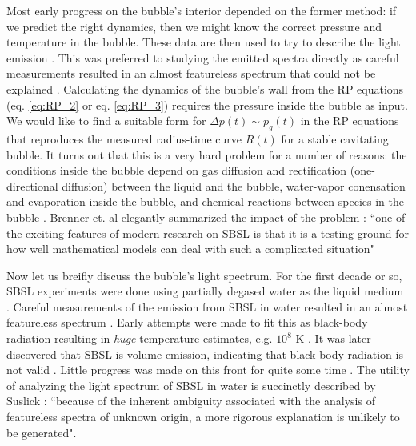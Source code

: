 \documentclass[rmp,aps,nofootinbib,superscriptaddress,floatfix]{revtex4-2}
\begin{document}
Most early progress on the bubble's interior depended on the former method: if we predict the right dynamics, then we might know the correct pressure and temperature in the bubble. These data are then used to try to describe the light emission \cite{}. This was preferred to studying the emitted spectra directly as careful measurements resulted in an almost featureless spectrum that could not be explained \cite{}. Calculating the dynamics of the bubble's wall from the RP equations (eq. \ref{eq:RP_2} or eq. \ref{eq:RP_3}) requires the pressure inside the bubble as input. We would like to find a suitable form for $\Delta p(t) \sim p_g(t)$ in the RP equations that reproduces the measured radius-time curve $R(t)$ for a stable cavitating bubble. It turns out that this is a very hard problem for a number of reasons: the conditions inside the bubble depend on gas diffusion and rectification (one-directional diffusion) between the liquid and the bubble, water-vapor conensation and evaporation inside the bubble, and chemical reactions between species in the bubble \cite{brenner2002single}. Brenner et. al elegantly summarized the impact of the problem \cite{brenner2002single}: ``one of the exciting features of modern research on SBSL is that it is a testing ground for how well mathematical models can deal with such a complicated situation"

Now let us breifly discuss the bubble's light spectrum. For the first decade or so, SBSL experiments were done using partially degased water as the liquid medium \cite{suslick2008inside,brenner2002single,gaitan1992sonoluminescence}. Careful measurements of the emission from SBSL in water resulted in an almost featureless spectrum \cite{}. Early attempts were made to fit this as black-body radiation resulting in \emph{huge} temperature estimates, e.g. $10^8$ K \cite{}. It was later discovered that SBSL is volume emission, indicating that black-body radiation is not valid \cite{}. Little progress was made on this front for quite some time \cite{brenner2002single}. The utility of analyzing the light spectrum of SBSL in water is succinctly described by Suslick \cite{suslick2008inside}: ``because of the inherent ambiguity associated with the analysis of featureless spectra of unknown origin, a more rigorous explanation is unlikely to be generated". 
\end{document}
